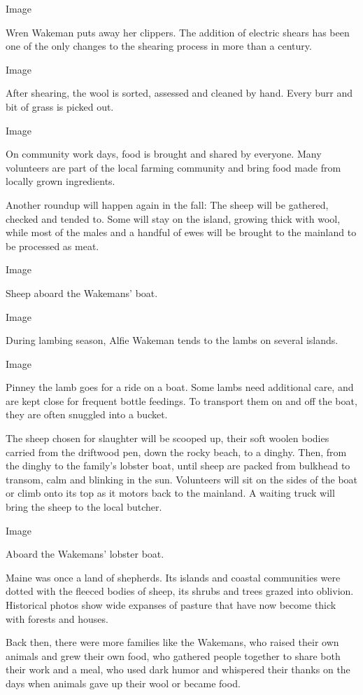 Image

Wren Wakeman puts away her clippers. The addition of electric shears has
been one of the only changes to the shearing process in more than a
century.~

Image

After shearing, the wool is sorted, assessed and cleaned by hand. Every
burr and bit of grass is picked out.

Image

On community work days, food is brought and shared by everyone. Many
volunteers are part of the local farming community and bring food made
from locally grown ingredients.

Another roundup will happen again in the fall: The sheep will be
gathered, checked and tended to. Some will stay on the island, growing
thick with wool, while most of the males and a handful of ewes will be
brought to the mainland to be processed as meat.

Image

Sheep aboard the Wakemans' boat.

Image

During lambing season, Alfie Wakeman tends to the lambs on several
islands.

Image

Pinney the lamb goes for a ride on a boat. Some lambs need additional
care, and are kept close for frequent bottle feedings. To transport them
on and off the boat, they are often snuggled into a bucket.

The sheep chosen for slaughter will be scooped up, their soft woolen
bodies carried from the driftwood pen, down the rocky beach, to a
dinghy. Then, from the dinghy to the family's lobster boat, until sheep
are packed from bulkhead to transom, calm and blinking in the sun.
Volunteers will sit on the sides of the boat or climb onto its top as it
motors back to the mainland. A waiting truck will bring the sheep to the
local butcher.

Image

Aboard the Wakemans' lobster boat.

Maine was once a land of shepherds. Its islands and coastal communities
were dotted with the fleeced bodies of sheep, its shrubs and trees
grazed into oblivion. Historical photos show wide expanses of pasture
that have now become thick with forests and houses.

Back then, there were more families like the Wakemans, who raised their
own animals and grew their own food, who gathered people together to
share both their work and a meal, who used dark humor and whispered
their thanks on the days when animals gave up their wool or became food.

